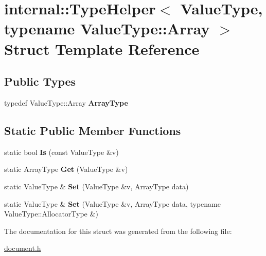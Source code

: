 \hypertarget{a00317}{}\section{internal\+:\+:Type\+Helper$<$ Value\+Type, typename Value\+Type\+:\+:Array $>$ Struct Template Reference}
\label{a00317}
\subsection*{Public Types}
\begin{DoxyCompactItemize}
\item 
typedef Value\+Type\+::\+Array {\bfseries Array\+Type}\hypertarget{a00317_a8f384dc96b6104e85b956ec5f7386434}{}\label{a00317_a8f384dc96b6104e85b956ec5f7386434}

\end{DoxyCompactItemize}
\subsection*{Static Public Member Functions}
\begin{DoxyCompactItemize}
\item 
static bool {\bfseries Is} (const Value\+Type \&v)\hypertarget{a00317_a2a052fc0139112075f8bade42964273d}{}\label{a00317_a2a052fc0139112075f8bade42964273d}

\item 
static Array\+Type {\bfseries Get} (Value\+Type \&v)\hypertarget{a00317_a0e6bd47ab5da0387bf419cdf644035ab}{}\label{a00317_a0e6bd47ab5da0387bf419cdf644035ab}

\item 
static Value\+Type \& {\bfseries Set} (Value\+Type \&v, Array\+Type data)\hypertarget{a00317_a7bab3fa93fb8bda16baf289e1d281315}{}\label{a00317_a7bab3fa93fb8bda16baf289e1d281315}

\item 
static Value\+Type \& {\bfseries Set} (Value\+Type \&v, Array\+Type data, typename Value\+Type\+::\+Allocator\+Type \&)\hypertarget{a00317_adba46e8947dcfecaeca5a5a5d8bb36cc}{}\label{a00317_adba46e8947dcfecaeca5a5a5d8bb36cc}

\end{DoxyCompactItemize}


The documentation for this struct was generated from the following file\+:\begin{DoxyCompactItemize}
\item 
\hyperlink{a00473}{document.\+h}\end{DoxyCompactItemize}
